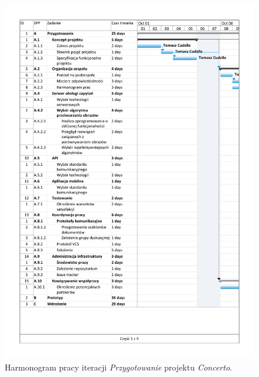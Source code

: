 \begin{figure}[p]
    \includegraphics[trim=1.2cm 1.2cm 1.2cm 1.2cm,page=1,width=\textwidth]{./figury/harmonogram/harmonogram-pracy-A-przygotowanie}
    \caption{Harmonogram pracy iteracji \emph{Przygotowanie} projektu \emph{Concerto}.}
    \label{fig:harmonogram:iteracja_przygotowanie}
\end{figure}

